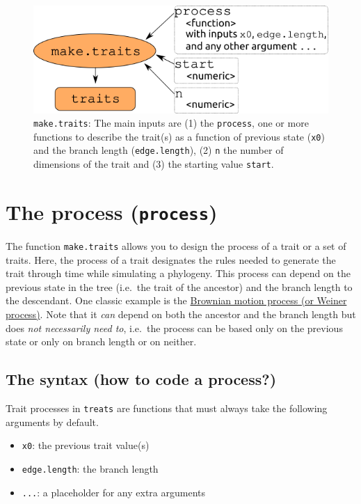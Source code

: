 \documentclass[
]{book}
\providecommand{\tightlist}{%
  \setlength{\itemsep}{0pt}\setlength{\parskip}{0pt}}
\begin{document}
\begin{figure}
\centering
\includegraphics{make.traits.png}
\caption{\texttt{make.traits}: The main inputs are (1) the \texttt{process}, one or more functions to describe the trait(s) as a function of previous state (\texttt{x0}) and the branch length (\texttt{edge.length}), (2) \texttt{n} the number of dimensions of the trait and (3) the starting value \texttt{start}.}
\end{figure}

\hypertarget{the-process-process}{%
\section{\texorpdfstring{The process (\texttt{process})}{The process (process)}}\label{the-process-process}}

The function \texttt{make.traits} allows you to design the process of a trait or a set of traits.
Here, the process of a trait designates the rules needed to generate the trait through time while simulating a phylogeny.
This process can depend on the previous state in the tree (i.e.~the trait of the ancestor) and the branch length to the descendant.
One classic example is the \href{https://en.wikipedia.org/wiki/Brownian_motion}{Brownian motion process (or Weiner process)}.
Note that it \emph{can} depend on both the ancestor and the branch length but does \emph{not necessarily need to}, i.e.~the process can be based only on the previous state or only on branch length or on neither.

\hypertarget{the-syntax-how-to-code-a-process}{%
\subsection{The syntax (how to code a process?)}\label{the-syntax-how-to-code-a-process}}

Trait processes in \texttt{treats} are functions that must always take the following arguments by default.

\begin{itemize}
\tightlist
\item
  \texttt{x0}: the previous trait value(s)
\item
  \texttt{edge.length}: the branch length
\item
  \texttt{...}: a placeholder for any extra arguments
\end{itemize}
\end{document}
